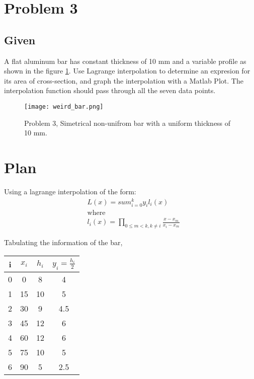 \documentclass[a4paper]{memoir}
\begin{document}
\section{Problem 3}
\subsection{Given}
A flat aluminum bar has constant thickness of 10 mm and a variable profile as shown in the figure \ref{fig:weird_bar}. Use Lagrange interpolation to determine an expresion for its area of cross-section, and graph the interpolation with a Matlab Plot. The interpolation function should pass through all the seven data points.

\begin{figure}
	\centering
		\texttt{[image: weird\_bar.png]}
	\caption{Problem 3, Simetrical non-unifrom bar with a uniform thickness of 10 mm.}
	\label{fig:weird_bar}
\end{figure}

\section{Plan}
Using a lagrange interpolation of the form:
\begin{align*}
		& L(x) = sum_{i=0}^k y_i l_i(x) \\
		& \text{where} \\
		& l_i(x)  = \prod_{0\leq m < k, k\neq i} \frac{x-x_m}{x_i-x_m}
\end{align*}

Tabulating the information of the bar, \\
\begin{center}
	\begin{tabular}{c | c | c | c}
	\hline
		i	&	$x_i$		& $h_i$ & $y_i=\frac{h_i}{2}$ \\ \hline
		0	& 0		&	8		&	4 	\\
		1	& 15	&	10	&	5		\\
		2 &	30	&	9		&	4.5	\\
		3	&	45	&	12	&	6		\\
		4 & 60	&	12	&	6		\\
		5	& 75	&	10	&	5		\\
		6	& 90	&	5		&	2.5	
	\end{tabular}
\end{center}
\end{document}
